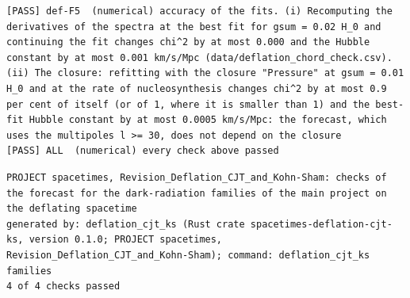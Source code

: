 \documentclass[
  10pt,
]{article}
\begin{document}
\begin{verbatim}
[PASS] def-F5  (numerical) accuracy of the fits. (i) Recomputing the derivatives of the spectra at the best fit for gsum = 0.02 H_0 and continuing the fit changes chi^2 by at most 0.000 and the Hubble constant by at most 0.001 km/s/Mpc (data/deflation_chord_check.csv). (ii) The closure: refitting with the closure "Pressure" at gsum = 0.01 H_0 and at the rate of nucleosynthesis changes chi^2 by at most 0.9 per cent of itself (or of 1, where it is smaller than 1) and the best-fit Hubble constant by at most 0.0005 km/s/Mpc: the forecast, which uses the multipoles l >= 30, does not depend on the closure
[PASS] ALL  (numerical) every check above passed
\end{verbatim}

\begin{verbatim}
PROJECT spacetimes, Revision_Deflation_CJT_and_Kohn-Sham: checks of the forecast for the dark-radiation families of the main project on the deflating spacetime
generated by: deflation_cjt_ks (Rust crate spacetimes-deflation-cjt-ks, version 0.1.0; PROJECT spacetimes, Revision_Deflation_CJT_and_Kohn-Sham); command: deflation_cjt_ks families
4 of 4 checks passed


\end{verbatim}
\end{document}
